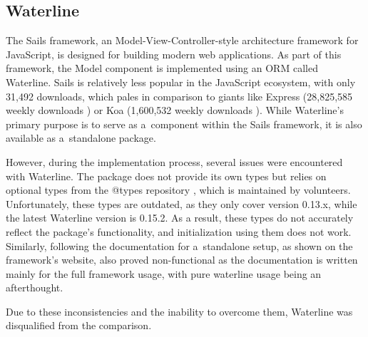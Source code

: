 \subsection{Waterline}

The Sails framework, an Model-View-Controller-style \cite[p.
330]{fowler-patterns-2003} architecture framework for JavaScript, is designed
for building modern web applications. As part of this framework, the Model
component is implemented using an ORM called Waterline. Sails is relatively less
popular in the JavaScript ecosystem, with only 31,492 downloads, which pales in
comparison to giants like Express (28,825,585 weekly downloads
\cite{express_2022}) or Koa (1,600,532 weekly downloads \cite{koa_2023}). While
Waterline's primary purpose is to serve as a~component within the Sails
framework, it is also available as a~standalone package.

However, during the implementation process, several issues were encountered with
Waterline. The package does not provide its own types but relies on optional
types from the @types repository \cite{definitelytyped/types/waterline}, which
is maintained by volunteers. Unfortunately, these types are outdated, as they
only cover version 0.13.x, while the latest Waterline version is 0.15.2. As a
result, these types do not accurately reflect the package's functionality, and
initialization using them does not work. Similarly, following the documentation
for a~standalone setup, as shown on the framework's website, also proved
non-functional as the documentation \cite{waterline-docs} is written mainly for
the full framework usage, with pure waterline usage being an afterthought.

Due to these inconsistencies and the inability to overcome them, Waterline was
disqualified from the comparison.